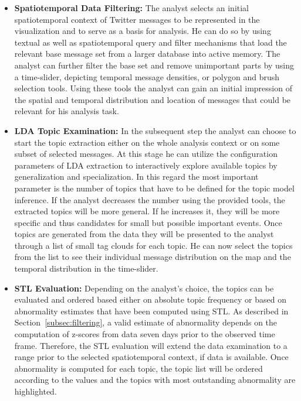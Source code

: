 \begin{itemize}
	\item \textbf{Spatiotemporal Data Filtering:} The analyst selects an initial spatiotemporal context of Twitter messages to be represented in the visualization and to serve as a basis for analysis. 
He can do so by using textual as well as spatiotemporal query and filter mechanisms that load the relevant base message set from a larger database into active memory. 
The analyst can further filter the base set and remove unimportant parts by using a time-slider, depicting temporal message densities, or polygon and brush selection tools.
Using these tools the analyst can gain an initial impression of the spatial and temporal distribution and location of messages that could be relevant for his analysis task.
	\item \textbf{LDA Topic Examination:} In the subsequent step the analyst can choose to start the topic extraction either on the whole analysis context or on some subset of selected messages. At this stage he can utilize the configuration parameters of LDA extraction to interactively explore available topics by generalization and specialization. In this regard the most important parameter is the number of topics that have to be defined for the topic model inference. If the analyst decreases the number using the provided tools, the extracted topics will be more general. If he increases it, they will be more specific and thus candidates for small but possible important events. Once topics are generated from the data they will be presented to the analyst through a list of small tag clouds for each topic. He can now select the topics from the list to see their individual message distribution on the map and the temporal distribution in the time-slider. 
	\item \textbf{STL Evaluation:} Depending on the analyst's choice, the topics can be evaluated and ordered based either on absolute topic frequency or based on abnormality estimates that have been computed using STL. As described in Section~\ref{subsec:filtering}, a valid estimate of abnormality depends on the computation of z-scores from data seven days prior to the observed time frame. Therefore, the STL evaluation will extend the data examination to a range prior to the selected spatiotemporal context, if data is available. Once abnormality is computed for each topic, the topic list will be ordered according to the values and the topics with most outstanding abnormality are highlighted.

\end{itemize}
